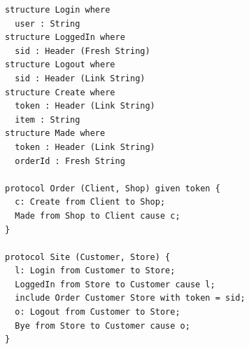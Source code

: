 \begin{lstlisting}[language={},basicstyle=\ttfamily\footnotesize,breaklines=true]
structure Login where
  user : String
structure LoggedIn where
  sid : Header (Fresh String)
structure Logout where
  sid : Header (Link String)
structure Create where
  token : Header (Link String)
  item : String
structure Made where
  token : Header (Link String)
  orderId : Fresh String

protocol Order (Client, Shop) given token {
  c: Create from Client to Shop;
  Made from Shop to Client cause c;
}

protocol Site (Customer, Store) {
  l: Login from Customer to Store;
  LoggedIn from Store to Customer cause l;
  include Order Customer Store with token = sid;
  o: Logout from Customer to Store;
  Bye from Store to Customer cause o;
}
\end{lstlisting}

